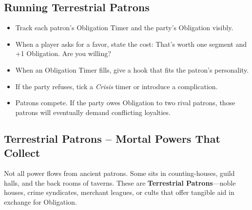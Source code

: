 \subsection{Running Terrestrial Patrons}
\begin{itemize}
  \item Track each patron's Obligation Timer and the party's Obligation visibly.
  \item When a player asks for a favor, state the cost: \textquotedbl That's worth one segment and +1 Obligation. Are you willing?\textquotedbl
  \item When an Obligation Timer fills, give a hook that fits the patron's personality.
  \item If the party refuses, tick a \textit{Crisis} timer or introduce a complication.
  \item Patrons compete. If the party owes Obligation to two rival patrons, those patrons will eventually demand conflicting loyalties.
\end{itemize}

\subsection*{Terrestrial Patrons -- Mortal Powers That Collect}

Not all power flows from ancient patrons. Some sits in counting-houses, guild halls, and the back rooms of taverns. These are \textbf{Terrestrial Patrons}---noble houses, crime syndicates, merchant leagues, or cults that offer tangible aid in exchange for Obligation.

\vspace{0.5em}

